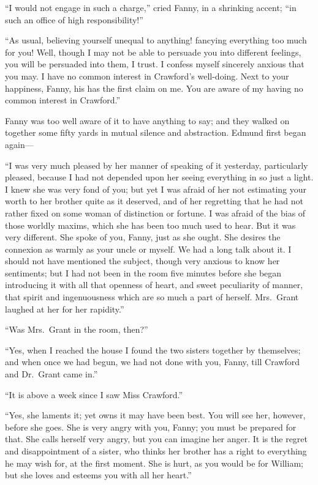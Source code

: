 \documentclass{article}
\begin{document}
``I would not engage in such a charge,'' cried Fanny, in a
shrinking accent; ``in such an office of high responsibility!''

``As usual, believing yourself unequal to anything!
fancying everything too much for you!  Well, though I
may not be able to persuade you into different feelings,
you will be persuaded into them, I trust.
I confess myself sincerely anxious that you may.
I have no common interest in Crawford's well-doing. Next
to your happiness, Fanny, his has the first claim on me.
You are aware of my having no common interest in Crawford.''

Fanny was too well aware of it to have anything to say;
and they walked on together some fifty yards in mutual
silence and abstraction.  Edmund first began again---%

``I was very much pleased by her manner of speaking
of it yesterday, particularly pleased, because I had not
depended upon her seeing everything in so just a light.
I knew she was very fond of you; but yet I was afraid
of her not estimating your worth to her brother quite
as it deserved, and of her regretting that he had not
rather fixed on some woman of distinction or fortune.
I was afraid of the bias of those worldly maxims, which she
has been too much used to hear.  But it was very different.
She spoke of you, Fanny, just as she ought.  She desires
the connexion as warmly as your uncle or myself.
We had a long talk about it.  I should not have mentioned
the subject, though very anxious to know her sentiments;
but I had not been in the room five minutes before she
began introducing it with all that openness of heart,
and sweet peculiarity of manner, that spirit and ingenuousness
which are so much a part of herself.  Mrs.\ Grant laughed
at her for her rapidity.''

``Was Mrs.\ Grant in the room, then?''

``Yes, when I reached the house I found the two sisters
together by themselves; and when once we had begun,
we had not done with you, Fanny, till Crawford and Dr.\ Grant
came in.''

``It is above a week since I saw Miss Crawford.''

``Yes, she laments it; yet owns it may have been best.
You will see her, however, before she goes.  She is very
angry with you, Fanny; you must be prepared for that.
She calls herself very angry, but you can imagine her anger.
It is the regret and disappointment of a sister,
who thinks her brother has a right to everything he may
wish for, at the first moment.  She is hurt, as you would
be for William; but she loves and esteems you with all
her heart.''
\end{document}
